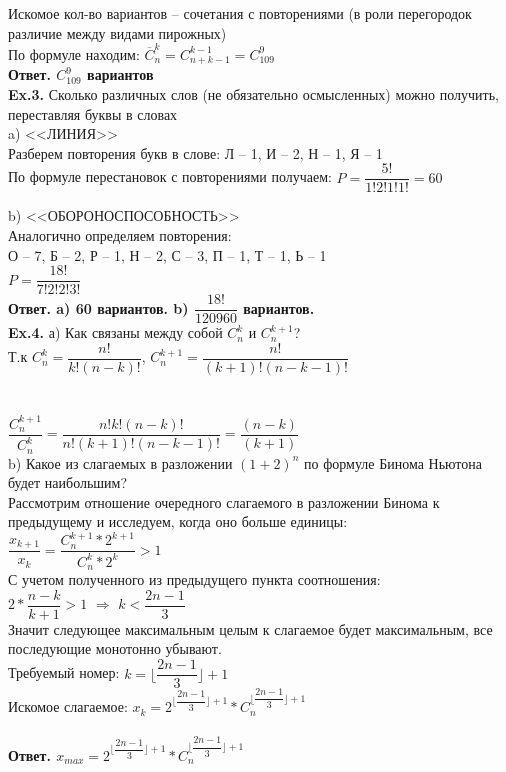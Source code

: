 \documentclass[a4paper,12pt]{article}
\begin{document}
Искомое кол-во вариантов -- сочетания с повторениями (в роли перегородок различие между видами пирожных)
\\
По формуле находим: $ \overline C_n^k = C_{n+k-1}^{k-1} = C_{109}^{9}$
\\
\textbf{Ответ. $ C_{109}^{9} $ вариантов}
\\

\textbf{Ex.3.} Сколько различных слов (не обязательно осмысленных) можно
получить, переставляя буквы в словах
\\

a) <<ЛИНИЯ>>
\\
Разберем повторения букв в слове: Л -- 1, И -- 2, Н -- 1, Я -- 1
\\
По формуле перестановок с повторениями получаем: $ P = \dfrac{5!}{1!2!1!1!} = 60 $

b) <<ОБОРОНОСПОСОБНОСТЬ>>
\\
Аналогично определяем повторения:
\\
 О -- 7, Б -- 2, Р -- 1, Н -- 2, С -- 3, П -- 1, Т -- 1, Ь -- 1
\\
$ P = \dfrac{18!}{7!2!2!3!} $
\\
\textbf{Ответ. a) 60 вариантов. b) $ \dfrac{18!}{120960} $ вариантов.}
\\

\textbf{Ex.4.} а) Как связаны между собой $ C_n^k $ и $ C_n^{k+1} $?
\\

Т.к $ C_n^k = \dfrac{n!}{k!(n-k)! } $, $ C_n^{k+1} = \dfrac{n!}{(k+1)!(n-k-1)!} $
\\
\\
\\
$ \dfrac{C_n^{k+1}}{C_n^k} = \dfrac{n!k!(n-k)!}{n!(k+1)!(n-k-1)!} = \dfrac{(n-k)}{(k+1)} $
\\

b) Какое из слагаемых в разложении $(1 + 2)^n$ по формуле Бинома Ньютона будет наибольшим?
\\

Рассмотрим отношение очередного слагаемого в разложении Бинома к предыдущему и исследуем, когда оно больше единицы:
\\
$ \dfrac{x_{k+1}}{x_k} = \dfrac{C_n^{k+1}*2^{k+1}}{C_n^k*2^k} > 1 $
\\
С учетом полученного из предыдущего пункта соотношения:
\\
$ 2* \dfrac{n-k}{k+1} > 1 $ $\Rightarrow$ 
$ k < \dfrac{2n-1}{3} $
\\
Значит следующее максимальным целым к слагаемое будет максимальным, все последующие монотонно убывают.
\\
Требуемый номер: $ k = \lfloor \dfrac{2n-1}{3} \rfloor + 1 $
\\
Искомое слагаемое: $ x_k = 2^{\lfloor \dfrac{2n-1}{3} \rfloor + 1} * C_n^{\lfloor \dfrac{2n-1}{3} \rfloor + 1} $
\\
\\
\textbf{Ответ. $ x_{max} = 2^{\lfloor \dfrac{2n-1}{3} \rfloor + 1} * C_n^{\lfloor \dfrac{2n-1}{3} \rfloor + 1} $}
\\
\end{document}

